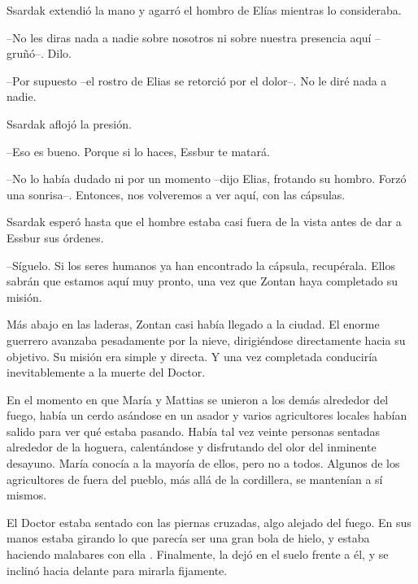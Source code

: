 Ssardak extendió la mano y agarró el hombro de Elías mientras lo consideraba. 

--No les diras nada a nadie sobre nosotros ni sobre nuestra presencia aquí --gruñó--. Dilo.



--Por supuesto --el rostro de Elias se retorció por el dolor--. No le diré nada a nadie.



Ssardak aflojó la presión. 


--Eso es bueno. Porque si lo haces, Essbur te matará. 


--No lo había dudado ni por un momento --dijo Elias, frotando su hombro. Forzó una sonrisa--. Entonces, nos volveremos a ver aquí, con las cápsulas.



Ssardak esperó hasta que el hombre estaba casi fuera de la vista antes de dar a Essbur sus órdenes. 


--Síguelo. Si los seres humanos ya han encontrado la cápsula, recupérala. Ellos sabrán que estamos aquí muy pronto, una vez que Zontan haya completado su misión.



\mbox{}



Más abajo en las laderas, Zontan casi había llegado a la ciudad. El enorme guerrero avanzaba pesadamente por la nieve, dirigiéndose directamente hacia su objetivo. Su misión era simple y directa. Y una vez completada conduciría inevitablemente a la muerte del Doctor.



\mbox{}



En el momento en que María y Mattias se unieron a los demás alrededor del fuego, había un cerdo asándose en un asador y varios agricultores locales habían salido para ver qué estaba pasando. Había tal vez veinte personas sentadas alrededor de la hoguera, calentándose y disfrutando del olor del inminente desayuno. María conocía a la mayoría de ellos, pero no a todos. Algunos de los agricultores de fuera del pueblo, más allá de la cordillera, se mantenían a sí mismos.



El Doctor estaba sentado con las piernas cruzadas, algo alejado del fuego. En sus manos estaba girando lo que parecía ser una gran bola de hielo, y estaba haciendo malabares con ella . Finalmente, la dejó en el suelo frente a él, y se inclinó hacia delante para mirarla fijamente.



